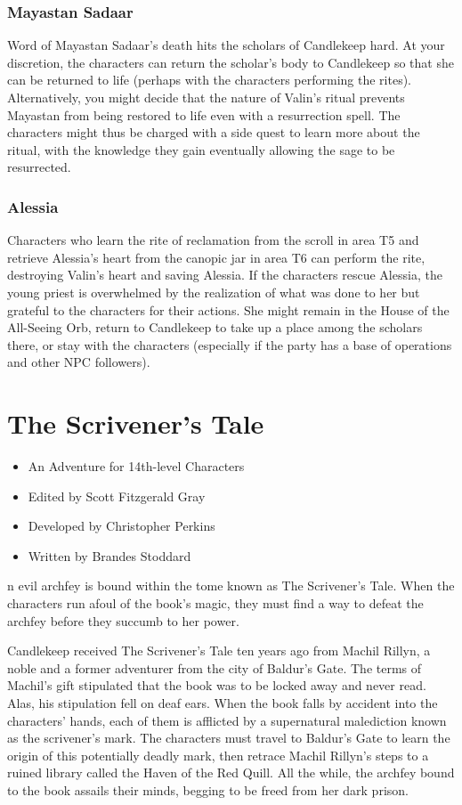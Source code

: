 \documentclass[10pt,a4paper,twoside,bg=print,twocolumn,openany,nodeprecatedcode]{dndbook}
\begin{document}
\subsection{Mayastan Sadaar}
Word of Mayastan Sadaar's death hits the scholars of Candlekeep hard. At your discretion, the characters can return the scholar's body to Candlekeep so that she can be returned to life (perhaps with the characters performing the rites). Alternatively, you might decide that the nature of Valin's ritual prevents Mayastan from being restored to life even with a resurrection spell. The characters might thus be charged with a side quest to learn more about the ritual, with the knowledge they gain eventually allowing the sage to be resurrected.

\subsection{Alessia}
Characters who learn the rite of reclamation from the scroll in area T5 and retrieve Alessia's heart from the canopic jar in area T6 can perform the rite, destroying Valin's heart and saving Alessia. If the characters rescue Alessia, the young priest is overwhelmed by the realization of what was done to her but grateful to the characters for their actions. She might remain in the House of the All-Seeing Orb, return to Candlekeep to take up a place among the scholars there, or stay with the characters (especially if the party has a base of operations and other NPC followers).

\chapter{The Scrivener's Tale}

\begin{itemize}
\item An Adventure for 14th-level Characters
\item Edited by Scott Fitzgerald Gray
\item Developed by Christopher Perkins
\item Written by Brandes Stoddard
\end{itemize}

n evil archfey is bound within the tome known as The Scrivener's Tale. When the characters run afoul of the book's magic, they must find a way to defeat the archfey before they succumb to her power.


Candlekeep received The Scrivener's Tale ten years ago from Machil Rillyn, a noble and a former adventurer from the city of Baldur's Gate. The terms of Machil's gift stipulated that the book was to be locked away and never read. Alas, his stipulation fell on deaf ears. When the book falls by accident into the characters' hands, each of them is afflicted by a supernatural malediction known as the scrivener's mark. The characters must travel to Baldur's Gate to learn the origin of this potentially deadly mark, then retrace Machil Rillyn's steps to a ruined library called the Haven of the Red Quill. All the while, the archfey bound to the book assails their minds, begging to be freed from her dark prison.
\end{document}
